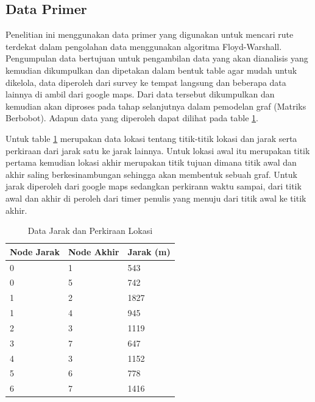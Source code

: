 \subsection{Data Primer}
\par Penelitian ini menggunakan data primer yang digunakan untuk mencari rute terdekat dalam pengolahan data menggunakan algoritma Floyd-Warshall. Pengumpulan data bertujuan untuk pengambilan data yang akan dianalisis yang kemudian dikumpulkan dan dipetakan dalam bentuk table agar mudah untuk dikelola, data diperoleh dari survey ke tempat langsung dan beberapa data lainnya di ambil dari google maps. Dari data tersebut dikumpulkan dan kemudian akan diproses pada tahap selanjutnya dalam pemodelan graf (Matriks Berbobot). Adapun data yang diperoleh dapat dilihat pada table \ref{table21}.
\par Untuk table \ref{table21} merupakan data lokasi tentang titik-titik lokasi dan jarak serta perkiraan dari jarak satu ke jarak lainnya. Untuk lokasi awal itu merupakan titik pertama kemudian lokasi akhir merupakan titik tujuan dimana titik awal dan akhir saling berkesinambungan sehingga akan membentuk sebuah graf. Untuk jarak diperoleh dari google maps sedangkan perkirann waktu sampai, dari titik awal dan akhir di peroleh dari timer penulis yang menuju dari titik awal ke titik akhir.
    
    \begin{table}[!htbp]
        \centering
        \caption{Data Jarak dan Perkiraan Lokasi}
        \label{table21}
        \begin{tabular}{|l|l|l|}
        \hline
            Node Jarak & Node Akhir & Jarak (m) \\
        \hline
            0 & 1 & 543 \\
        \hline
            0 & 5 & 742 \\
        \hline
            1 & 2 & 1827 \\
        \hline
            1 & 4 & 945 \\
        \hline
            2 & 3 & 1119 \\
        \hline
            3 & 7 & 647 \\
        \hline
            4 & 3 & 1152 \\
        \hline
            5 & 6 & 778 \\
        \hline
            6 & 7 & 1416 \\
        \hline
        \end{tabular}
    \end{table}
    
